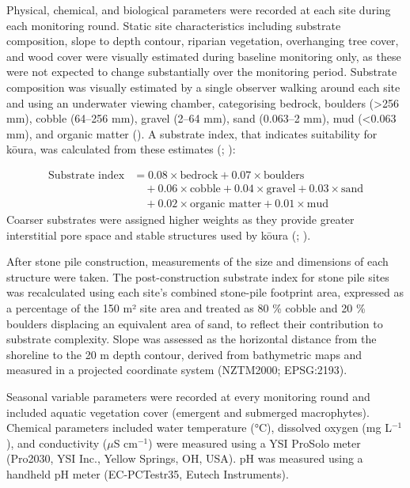 \documentclass[
  letterpaper,
  DIV=11,
  numbers=noendperiod]{scrartcl}
\begin{document}
Physical, chemical, and biological parameters were recorded at each site
during each monitoring round. Static site characteristics including
substrate composition, slope to depth contour, riparian vegetation,
overhanging tree cover, and wood cover were visually estimated during
baseline monitoring only, as these were not expected to change
substantially over the monitoring period. Substrate composition was
visually estimated by a single observer walking around each site and
using an underwater viewing chamber, categorising bedrock, boulders
(\textgreater256 mm), cobble (64--256 mm), gravel (2--64 mm), sand
(0.063--2 mm), mud (\textless0.063 mm), and organic matter
(). A substrate index, that
indicates suitability for kōura, was calculated from these estimates
(;
):

\[
\begin{aligned}
\text{Substrate index} &= 0.08 \times \text{bedrock} + 0.07 \times \text{boulders} \\
&\quad + 0.06 \times \text{cobble} + 0.04 \times \text{gravel} + 0.03 \times \text{sand} \\
&\quad + 0.02 \times \text{organic matter} + 0.01 \times \text{mud}
\end{aligned}
\] Coarser substrates were assigned higher weights as they provide
greater interstitial pore space and stable structures used by kōura
(;
).

After stone pile construction, measurements of the size and dimensions
of each structure were taken. The post-construction substrate index for
stone pile sites was recalculated using each site's combined stone-pile
footprint area, expressed as a percentage of the 150 m² site area and
treated as 80 \% cobble and 20 \% boulders displacing an equivalent area
of sand, to reflect their contribution to substrate complexity. Slope
was assessed as the horizontal distance from the shoreline to the 20 m
depth contour, derived from bathymetric maps and measured in a projected
coordinate system (NZTM2000; EPSG:2193).

Seasonal variable parameters were recorded at every monitoring round and
included aquatic vegetation cover (emergent and submerged macrophytes).
Chemical parameters included water temperature (°C), dissolved oxygen
(mg L\(^{-1}\)), and conductivity (\(\mu\)S cm\(^{-1}\)) were measured
using a YSI ProSolo meter (Pro2030, YSI Inc., Yellow Springs, OH, USA).
pH was measured using a handheld pH meter (EC-PCTestr35, Eutech
Instruments).
\end{document}
